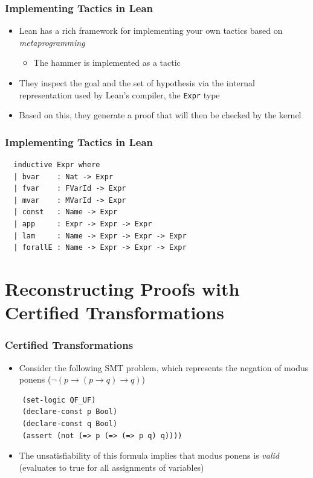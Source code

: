 \documentclass[usepdftitle=false,aspectratio=169,usenames,dvipsnames]{beamer}
\newcommand\vitem{\vfill\item}
\begin{document}
\begin{frame}
  \frametitle{Implementing Tactics in Lean}
  \begin{itemize}
    \item Lean has a rich framework for implementing your own tactics based on \textit{metaprogramming}
    \begin{itemize}
      \item The hammer is implemented as a tactic
    \end{itemize}
    \vitem They inspect the goal and the set of hypothesis via the internal representation used by Lean's compiler, the \texttt{Expr} type
    \vitem Based on this, they generate a proof that will then be checked by the kernel
  \end{itemize}
\end{frame}

\begin{frame}[fragile]
  \frametitle{Implementing Tactics in Lean}
  \begin{verbatim}
  inductive Expr where
  | bvar    : Nat -> Expr
  | fvar    : FVarId -> Expr
  | mvar    : MVarId -> Expr
  | const   : Name -> Expr
  | app     : Expr -> Expr -> Expr
  | lam     : Name -> Expr -> Expr -> Expr
  | forallE : Name -> Expr -> Expr -> Expr
  \end{verbatim}

\end{frame}

\section{Reconstructing Proofs with Certified Transformations}

\begin{frame}[fragile]
  \frametitle{Certified Transformations}
  \begin{itemize}
    \item Consider the following SMT problem, which represents the negation of modus ponens ($\neg (p \rightarrow (p \rightarrow q) \rightarrow q)$)
  \end{itemize}
  \vfill
  \centering
  \begin{verbatim}
    (set-logic QF_UF)
    (declare-const p Bool)
    (declare-const q Bool)
    (assert (not (=> p (=> (=> p q) q))))
  \end{verbatim}
  \vfill
  \begin{itemize}
    \item The unsatisfiability of this formula implies that modus ponens is \textit{valid} (evaluates to true for all assignments of variables)
  \end{itemize}
\end{frame}
\end{document}
